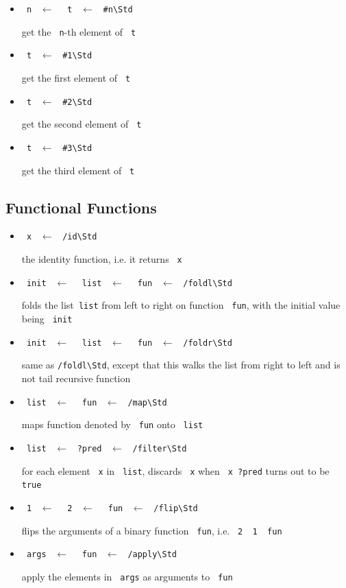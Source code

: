 \documentclass{report}
\newcommand{\mstd}[1]{\texttt{#1\textbackslash Std}}
\newcommand{\mtilde}[1]{\textasciitilde}
\newcommand{\marg}[1]{\texttt{\mtilde ~#1}}
\newcommand{\mla}[0]{~$\leftarrow$ ~}
\begin{document}
\begin{itemize}
\item \marg{n} \mla \marg{t} \mla \mstd{\#n}

get the \marg{n}-th element of \marg{t}
\item \marg{t} \mla \mstd{\#1}

get the first element of \marg{t}
\item \marg{t} \mla \mstd{\#2}

get the second element of \marg{t}
\item \marg{t} \mla \mstd{\#3}

get the third element of \marg{t}
\end{itemize}

\subsection{Functional Functions}

\begin{itemize}
\item \marg{x} \mla \mstd{/id}

the identity function, i.e. it returns \marg{x}
\item \marg{init} \mla \marg{list} \mla \marg{fun} \mla \mstd{/foldl}

folds the  list\marg{list} from left to right on function \marg{fun}, with the initial value being \marg{init}
\item \marg{init} \mla \marg{list} \mla \marg{fun} \mla \mstd{/foldr}

same as \mstd{/foldl}, except that this walks the list from right to left and is not tail recursive function
\item \marg{list} \mla \marg{fun} \mla \mstd{/map}

maps function denoted by \marg{fun} onto \marg{list}
\item \marg{list} \mla \texttt{?pred} \mla \mstd{/filter}

for each element \marg{x} in \marg{list}, discards \marg{x} when \texttt{\marg{x} ?pred} turns out to be \texttt{true}
\item \marg1 \mla \marg2 \mla \marg{fun} \mla \mstd{/flip}

flips the arguments of a binary function \marg{fun}, i.e. \texttt{\marg2 \marg1 \marg{fun}}
\item \marg{args} \mla \marg{fun} \mla \mstd{/apply}

apply the elements in \marg{args} as arguments to \marg{fun}
\end{itemize}
\end{document}
